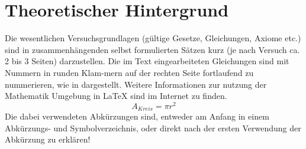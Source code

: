 \section{Theoretischer Hintergrund}
Die wesentlichen Versuchsgrundlagen (gültige Gesetze, Gleichungen, Axiome etc.) sind in zusammenhängenden selbst formulierten Sätzen kurz (je nach Versuch ca. 2 bis 3 Seiten) darzustellen. 
Die im Text eingearbeiteten Gleichungen sind mit Nummern in runden Klam-mern auf der rechten Seite fortlaufend zu nummerieren, wie in  dargestellt. 
Weitere Informationen zur nutzung der Mathematik Umgebung in LaTeX sind im Internet zu finden.
%
\begin{equation}
	A_{Kreis} = \pi r^{2}
	\label{eq:Fl.Kreis}
\end{equation}
%
Die dabei verwendeten Abkürzungen sind, entweder am Anfang in einem Abkürzungs- und Symbolverzeichnis, oder direkt nach der ersten Verwendung der Abkürzung zu erklären!\\